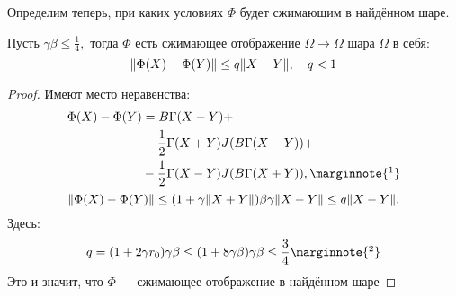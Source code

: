 Определим теперь, при каких условиях \( \Phi \) будет сжимающим в найдённом шаре.
\begin{lemma}
    Пусть \( \gamma\beta \leq \frac14, \)
    тогда \( \Phi \) есть сжимающее отображение \(\Omega\to\Omega\) шара \(\Omega\) в себя:
    \[ {\left\|{\Phi(X)-\Phi(Y)}\right\|} \leq q {\left\|{X-Y}\right\|}, \quad q<1\]
\end{lemma}
\begin{proof}
    Имеют место неравенства:
    \begin{align*}
        \Phi(X) - \Phi(Y) &= B\Gamma (X-Y) + \\
        &- \frac12 \Gamma (X + Y)J(B\Gamma(X - Y)) + \\
        &- \frac12 \Gamma (X - Y)J(B\Gamma(X + Y)),
        \marginnote{\footnotemark}
    \end{align*}
    \[
        {\left\|{\Phi(X) - \Phi(Y)}\right\|} \leq (1 + \gamma{\left\|{X+Y}\right\|})\beta\gamma {\left\|{X-Y}\right\|} \leq q{\left\|{X-Y}\right\|}.
        \]
    Здесь:
    \begin{equation}\label{eq:lipconst}
        q = (1+2\gamma r_0)\gamma\beta
        \leq (1+8\gamma\beta)\gamma\beta \leq \frac{3}{4}
        \marginnote{\footnotemark}
    \end{equation}
    Это и значит, что \( \Phi \) --- сжимающее отображение в найдённом шаре
\end{proof}


